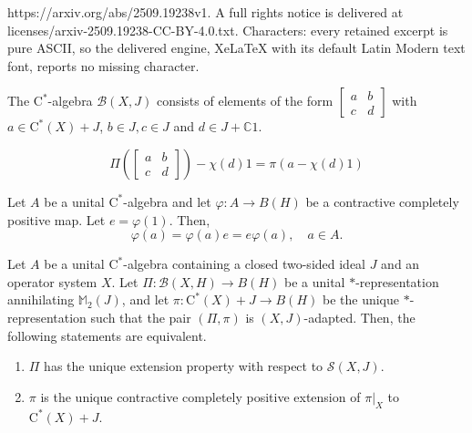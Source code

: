 \documentclass[10pt,a4paper]{amsart}
\newcommand{\B}{{\mathcal{B}}}
\newcommand{\bC}{{\mathbb{C}}}
\newcommand{\bM}{{\mathbb{M}}}
\newcommand{\rC}{\mathrm{C}}
\renewcommand{\S}{{\mathcal{S}}}
\renewcommand{\phi}{\varphi}
\begin{document}
https://arxiv.org/abs/2509.19238v1. A full rights notice is delivered at licenses/arxiv-2509.19238-CC-BY-4.0.txt. Characters: every retained excerpt is pure ASCII, so the delivered engine, XeLaTeX with its default Latin Modern text font, reports no missing character.
\begin{lemma}\label{L:JinB}
The $\rC^*$-algebra $\B(X,J)$ consists of elements of the form $\begin{bmatrix} a & b \\ c & d\end{bmatrix}$ with $a\in \rC^*(X)+J$, $b\in J, c\in J$ and $d\in J+\bC 1$.
\end{lemma}

\begin{equation}\label{Eq:adapted}
\Pi\left(\begin{bmatrix}
a& b \\ c & d
\end{bmatrix}\right)-\chi(d)1=\pi(a-\chi(d)1)
\end{equation}

\begin{lemma}\label{L:nonunital}
Let $A$ be a unital $\rC^*$-algebra and let $\phi:A\to B(H)$ be a contractive completely positive map. Let $e=\phi(1)$. Then,
\[
\phi(a)=\phi(a)e=e\phi(a), \quad a\in A.
\]
\end{lemma}

\begin{theorem}\label{T:singrepuep}
Let $A$ be a unital $\rC^*$-algebra containing a closed two-sided ideal $J$ and an operator system $X$. Let $\Pi:\B(X,H)\to B(H)$ be a unital $*$-representation annihilating $\bM_2(J)$, and let $\pi:\rC^*(X)+J\to B(H)$ be the unique $*$-representation such that the pair $(\Pi,\pi)$ is $(X,J)$-adapted. Then, the following statements are equivalent.
\begin{enumerate}[{\rm (i)}]
\item $\Pi$ has the unique extension property with respect to $\S(X,J)$.
\item $\pi$ is the  unique contractive completely positive extension of $\pi|_X$ to $\rC^*(X)+J$.
\end{enumerate}
\end{theorem}
\end{document}
